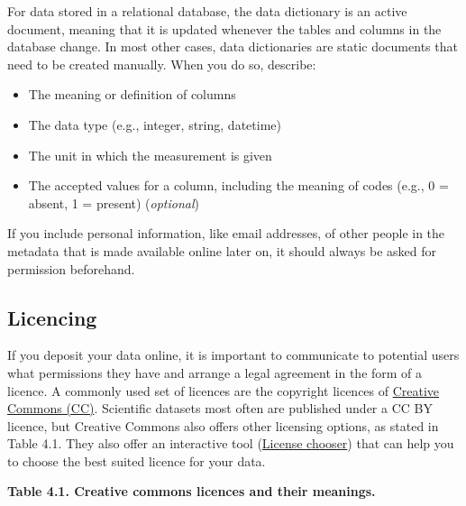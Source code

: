\documentclass[
  oneside]{book}
\begin{document}
For data stored in a relational database, the data dictionary is an active document, meaning that it is updated whenever the tables and columns in the database change. In most other cases, data dictionaries are static documents that need to be created manually. When you do so, describe:

\begin{itemize}
\item
  The meaning or definition of columns
\item
  The data type (e.g., integer, string, datetime)
\item
  The unit in which the measurement is given
\item
  The accepted values for a column, including the meaning of codes (e.g., 0 = absent, 1 = present) (\emph{optional})
\end{itemize}

If you include personal information, like email addresses, of other people in the metadata that is made available online later on, it should always be asked for permission beforehand.

\subsection{Licencing}\label{licencing}

If you deposit your data online, it is important to communicate to potential users what permissions they have and arrange a legal agreement in the form of a licence. A commonly used set of licences are the copyright licences of \href{https://creativecommons.org/share-your-work/cclicenses/}{Creative Commons (CC)}. Scientific datasets most often are published under a CC BY licence, but Creative Commons also offers other licensing options, as stated in Table 4.1. They also offer an interactive tool (\href{https://chooser-beta.creativecommons.org/}{License chooser}) that can help you to choose the best suited licence for your data.

{\textbf{Table 4.1. Creative commons licences and their meanings.}}
\end{document}
